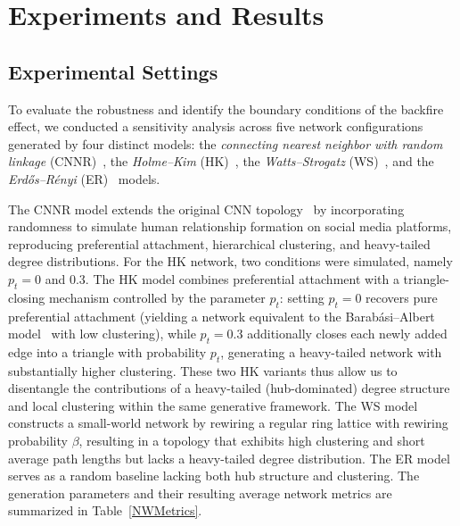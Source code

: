 \documentclass[pdflatex,sn-mathphys-num]{sn-jnl}%
\theoremstyle{thmstyleone}%
\theoremstyle{thmstyletwo}%
\theoremstyle{thmstylethree}%
\begin{document}
\section{Experiments and Results}
\subsection{Experimental Settings}

To evaluate the robustness and identify the boundary conditions of the backfire effect, we conducted a sensitivity analysis across five network configurations generated by four distinct models: the \emph{connecting nearest neighbor with random linkage} (CNNR)~\cite{Yuta2007}, the \emph{Holme--Kim} (HK)~\cite{Holme2002}, the \emph{Watts--Strogatz} (WS)~\cite{Watts1998}, and the \emph{Erd\H{o}s--R\'{e}nyi} (ER)~\cite{Erdos1959} models.

The CNNR model extends the original CNN topology~\cite{Vazquez2003}
by incorporating randomness to simulate human relationship formation
on social media platforms, reproducing preferential attachment,
hierarchical clustering, and heavy-tailed degree distributions.
For the HK network, two conditions were simulated,
namely $p_t = 0$ and $0.3$.
The HK model combines preferential attachment with a triangle-closing
mechanism controlled by the parameter $p_t$: setting $p_t = 0$
recovers pure preferential attachment (yielding a network equivalent
to the Barab\'{a}si--Albert model~\cite{Barabasi1999} with
low clustering), while $p_t = 0.3$ additionally closes each newly
added edge into a triangle with probability $p_t$, generating a
heavy-tailed network with substantially higher clustering.
These two HK variants thus allow us to disentangle the contributions of a
heavy-tailed (hub-dominated) degree structure and local clustering
within the same generative framework.
The WS model constructs a small-world network by rewiring a regular
ring lattice with rewiring probability $\beta$, resulting in a topology that exhibits high clustering and short average path lengths but lacks a heavy-tailed degree distribution. The ER model serves as a random baseline lacking both hub structure and clustering. The generation parameters and their resulting average network metrics are summarized in Table~\ref{NWMetrics}.
\par
\end{document}
